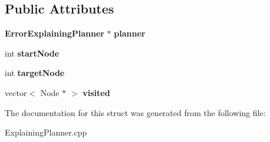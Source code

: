 \subsection*{Public Attributes}
\begin{DoxyCompactItemize}
\item 
{\bf Error\+Explaining\+Planner} $\ast$ {\bfseries planner}\label{structGreedySubsetAStar_a91e00bacccd22a3cbd3a2ad67dc2876b}

\item 
int {\bfseries start\+Node}\label{structGreedySubsetAStar_ab5623e2391b2f65e1a187b4ed5c3387e}

\item 
int {\bfseries target\+Node}\label{structGreedySubsetAStar_aa99f320a6c6ff15a5a1d3186de415638}

\item 
vector$<$ Node $\ast$ $>$ {\bfseries visited}\label{structGreedySubsetAStar_a79b5f2b372b305acfdf38236b2d580b0}

\end{DoxyCompactItemize}


The documentation for this struct was generated from the following file\+:\begin{DoxyCompactItemize}
\item 
Explaining\+Planner.\+cpp\end{DoxyCompactItemize}
